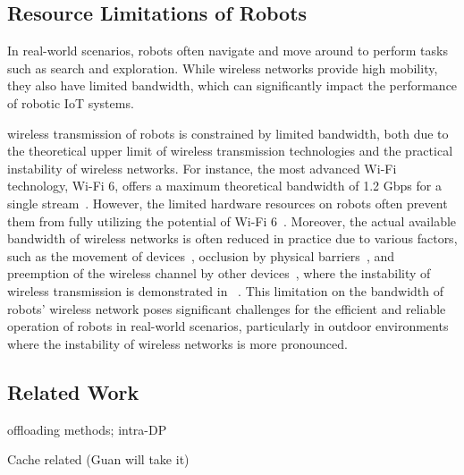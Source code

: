 \subsection{Resource Limitations of Robots}
In real-world scenarios, robots often navigate and move around to perform tasks such as search and exploration. 
While wireless networks provide high mobility, they also have limited bandwidth, which can significantly impact the performance of robotic IoT systems.

wireless transmission of robots is constrained by limited bandwidth, both due to the theoretical upper limit of wireless transmission technologies and the practical instability of wireless networks. 
For instance, the most advanced Wi-Fi technology, Wi-Fi 6, offers a maximum theoretical bandwidth of 1.2 Gbps for a single stream~\cite{liu2023first}. However, the limited hardware resources on robots often prevent them from fully utilizing the potential of Wi-Fi 6~\cite{yang2022mobile}. 
Moreover, the actual available bandwidth of wireless networks is often reduced in practice due to various factors, such as the movement of devices~\cite{masiukiewicz2019throughput, pei2013connectivity}, occlusion by physical barriers~\cite{ding2015performance, sarkar2013effect}, and preemption of the wireless channel by other devices~\cite{adame2021time, ren2018proportional}, where the instability of wireless transmission is demonstrated in ~\cite{sun2024hybridparallel}.
This limitation on the bandwidth of robots' wireless network poses significant challenges for the efficient and reliable operation of robots in real-world scenarios, particularly in outdoor environments where the instability of wireless networks is more pronounced.

\subsection{Related Work}
offloading methods; intra-DP

Cache related (Guan will take it)
